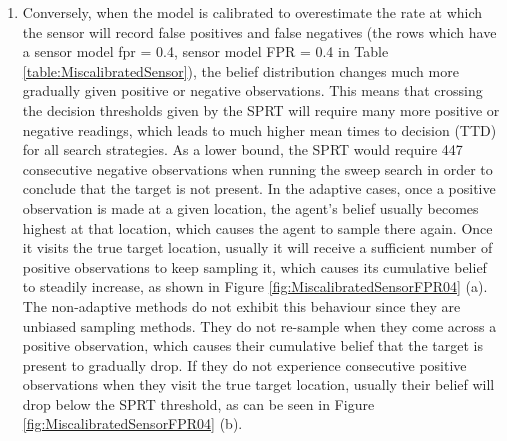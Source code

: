 \begin{enumerate}
    \item Conversely, when the model is calibrated to overestimate the rate at which the sensor will record false positives and false negatives (the rows which have a sensor model fpr = 0.4, sensor model FPR = 0.4 in Table \ref{table:MiscalibratedSensor}), the belief distribution changes much more gradually given positive or negative observations. This means that crossing the decision thresholds given by the SPRT will require many more positive or negative readings, which leads to much higher mean times to decision (TTD) for all search strategies. As a lower bound, the SPRT would require 447 consecutive negative observations when running the sweep search in order to conclude that the target is not present. In the adaptive cases, once a positive observation is made at a given location, the agent's belief usually becomes highest at that location, which causes the agent to sample there again. Once it visits the true target location, usually it will receive a sufficient number of positive observations to keep sampling it, which causes its cumulative belief to steadily increase, as shown in Figure \ref{fig:MiscalibratedSensorFPR04} (a). The non-adaptive methods do not exhibit this behaviour since they are unbiased sampling methods. They do not re-sample when they come across a positive observation, which causes their cumulative belief that the target is present to gradually drop. If they do not experience consecutive positive observations when they visit the true target location, usually their belief will drop below the SPRT threshold, as can be seen in Figure \ref{fig:MiscalibratedSensorFPR04} (b).
\end{enumerate}

